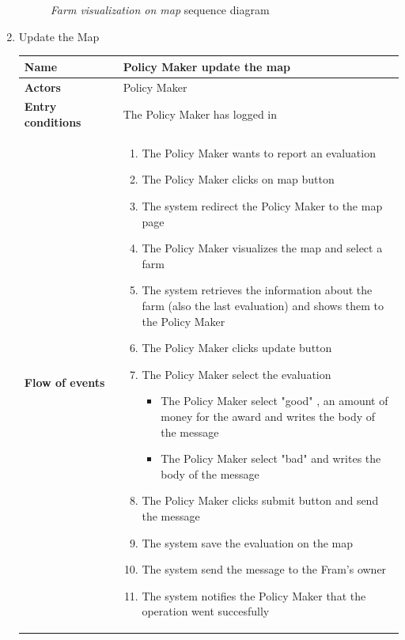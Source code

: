 \begin{enumerate}
\begin{figure}[H]
\begin{center}
        \caption{\emph{Farm visualization on map} sequence diagram}
        \label{fig:state9}
        \end{center}
    \end{figure}

    \item Update the Map
    \begin{longtable}{p{0.26\linewidth}p{0.75\linewidth}}
        \toprule
        \textbf{Name} & \textbf{Policy Maker update the map} \\
        \midrule
        \textbf{Actors} & Policy Maker \\
        \midrule
        \textbf{Entry conditions} & The Policy Maker has logged in\\
        \midrule
        \textbf{Flow of events} & 
        \begin{enumerate}
            \item The Policy Maker wants to report an evaluation
            \item The Policy Maker clicks on map button
            \item The system redirect the Policy Maker to the map page
            \item The Policy Maker visualizes the map and select a farm
            \item The system retrieves the information about the farm (also the last evaluation) and shows them to the Policy Maker
            \item The Policy Maker clicks update button
            \item The Policy Maker select the evaluation
                \begin{itemize}
                    \item The Policy Maker select "good" , an amount of money for the award and writes the body of the message
                    \item The Policy Maker select "bad" and writes the body of the message
                \end{itemize}
            \item The Policy Maker clicks submit button and send the message
            \item The system save the evaluation on the map
            \item The system send the message to the Fram's owner
            \item The system notifies the Policy Maker that the operation went succesfully 
        \end{enumerate} \\

\end{longtable}
\end{enumerate}
